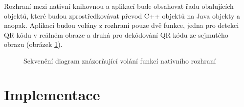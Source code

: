 Rozhraní mezi nativní knihovnou a aplikací bude obsahovat řadu obalujících
objektů, které budou zprostředkovávat převod C++ objektů na Java objekty a 
naopak. Aplikací budou volány z rozhraní pouze dvě funkce, jedna pro detekci
QR kódu v reálném obraze a druhá pro dekódování QR kódu ze sejmutého obrazu
(obrázek \ref{QRReaderApplicationNativeCalls}).

\begin{figure}[H]
  \begin{center}
    \caption{Sekvenční diagram znázorňující volání funkcí nativního rozhraní}
    \label{QRReaderApplicationNativeCalls}
  \end{center}
\end{figure}

\chapter{Implementace}
\label{implementace}


